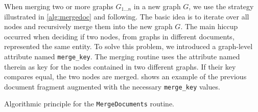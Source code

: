 When merging two or more graphs $G_{1...n}$ in a new graph $G$, we use the strategy illustrated in \vref{alg:mergedoc} and following. The basic idea is to iterate over all nodes and recursively merge them into the new graph $G$. The main hiccup occurred when deciding if two nodes, from graphs in different documents, represented the same entity. To solve this problem, we introduced a graph-level attribute named \texttt{merge\_key}. The merging routine uses the attribute named therein as key for the nodes contained in two different graphs. If their key compares equal, the two nodes are merged.  shows an example of the previous document fragment augmented with the necessary \texttt{merge\_key} values.

\begin{algorithm}[p]
\begin{algorithmic}
  \SetAlgoLined
  \SetNlSty{}{}{}
  \DontPrintSemicolon


  \BlankLine

  \CopyAttributeDefinitions{\d, \dd}\;
  \BlankLine

  \MergeGraphs{\GetGraph{\d}, \GetGraph{\dd}}
\end{algorithmic}  
\caption[Algorithmic principle for the \texttt{MergeDocuments} routine.]{Algorithmic principle for the \texttt{MergeDocuments} routine.}
\label{alg:mergedoc}
\end{algorithm}


